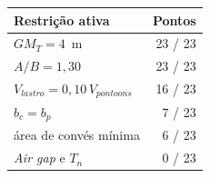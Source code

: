 \begin{tabular}{lr}
\toprule
Restrição ativa & Pontos \\
\midrule
$GM_T = 4$~m & 23 / 23 \\
$A/B = 1{,}30$ & 23 / 23 \\
$V_{lastro} = 0{,}10\,V_{pontoons}$ & 16 / 23 \\
$b_c = b_p$ & 7 / 23 \\
área de convés mínima & 6 / 23 \\
\emph{Air gap} e $T_n$ & 0 / 23 \\
\bottomrule
\end{tabular}
